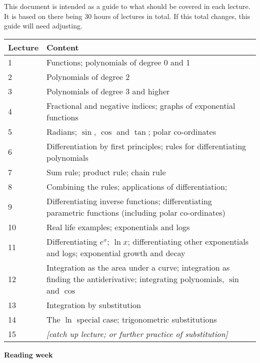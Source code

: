 \documentclass[11pt,a4paper,oneside]{book}
\begin{document}
This document is intended as a guide to what should be covered in each lecture.
It is based on there being 30 hours of lectures in total.
If this total changes, this guide will need adjusting.

\begin{tabular}{|p{}|p{}|}
  \hline
  \textbf{Lecture} & \textbf{Content} \\  \hline
  1 & Functions; polynomials of degree 0 and 1 \\  \hline
  2 & Polynomials of degree 2 \\  \hline
  3 & Polynomials of degree 3 and higher \\  \hline
  4 & Fractional and negative indices; graphs of exponential functions\\  \hline
  5 & Radians; $\sin$, $\cos$ and $\tan$; polar co-ordinates\\  \hline
  6 & Differentiation by first principles; rules for differentiating polynomials\\  \hline
  7 & Sum rule; product rule; chain rule\\  \hline
  8 & Combining the rules; applications of differentiation;\\  \hline
  9 & Differentiating inverse functions; differentiating parametric functions (including polar co-ordinates)\\  \hline
  10 & Real life examples; exponentials and logs\\ \hline
  11 & Differentiating $e^x$; $\ln x$; differentiating other exponentials and logs; exponential growth and decay\\  \hline
  12 & Integration as the area under a curve; integration as finding the antiderivative; integrating polynomials, $\sin$ and $\cos$\\  \hline
  13 & Integration by substitution\\  \hline
  14 & The $\ln$ special case; trigonometric substitutions\\  \hline
  15 & \textit{[catch up lecture; or further practice of substitution]}\\  \hline
\end{tabular}

\vspace{-5mm}
\begin{center}\textbf{Reading week}\end{center}
\vspace{-5mm}
\end{document}
